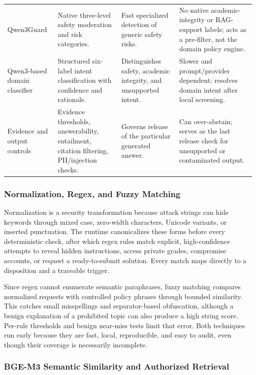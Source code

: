 \documentclass[conference,a4paper]{IEEEtran}
\begin{document}
\begin{table}[t]
\begin{tabularx}{\textwidth}{L{2.05cm} L{5.40cm} L{3.80cm} Y}
Qwen3Guard & Native three-level safety moderation and risk categories. & Fast specialized detection of generic safety risks. & No native academic-integrity or RAG-support labels; acts as a pre-filter, not the domain policy engine. \\
Qwen3-based domain classifier & Structured six-label intent classification with confidence and rationale. & Distinguishes safety, academic integrity, and unsupported intent. & Slower and prompt/provider dependent; resolves domain intent after local screening. \\
Evidence and output controls & Evidence thresholds, answerability, entailment, citation filtering, PII/injection checks. & Governs release of the particular generated answer. & Can over-abstain; serves as the last release check for unsupported or contaminated output. \\
\bottomrule
\end{tabularx}
\end{table}

\subsubsection{Normalization, Regex, and Fuzzy Matching}

Normalization is a security transformation because attack strings can hide keywords through mixed case, zero-width characters, Unicode variants, or inserted punctuation. The runtime canonicalizes these forms before every deterministic check, after which regex rules match explicit, high-confidence attempts to reveal hidden instructions, access private grades, compromise accounts, or request a ready-to-submit solution. Every match maps directly to a disposition and a traceable trigger.

Since regex cannot enumerate semantic paraphrases, fuzzy matching compares normalized requests with controlled policy phrases through bounded similarity. This catches small misspellings and separator-based obfuscation, although a benign explanation of a prohibited topic can also produce a high string score. Per-rule thresholds and benign near-miss tests limit that error. Both techniques run early because they are fast, local, reproducible, and easy to audit, even though their coverage is necessarily incomplete.

\subsubsection{BGE-M3 Semantic Similarity and Authorized Retrieval}
\end{document}
